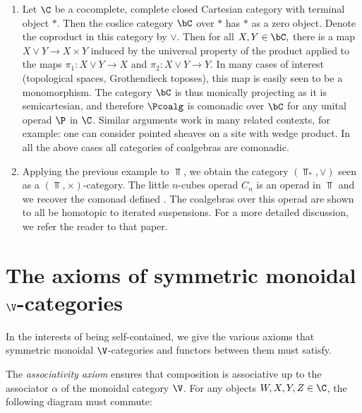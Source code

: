 \documentclass{tac}
\def\id{\operatorname{id}}
\def\bTop{{\Top_\ast}}
\begin{document}
\begin{enumerate}
     It follows that categories of $\P$-coalgebras in the above categories are comonadic.
    \item
    Let $\C$ be a cocomplete, complete closed Cartesian category with terminal object $\ast$. Then the coslice category $\bC$ over $\ast$ has $\ast$ as a zero object. Denote the coproduct in this category by $\vee.$ Then for all $X, Y \in \bC,$ there is a map $X \vee Y \to X\times Y$ induced by the universal property of the product applied to the maps $\pi_1: X\vee Y \to X$ and $\pi_2: X\vee Y \to Y.$ In many cases of interest (topological spaces, Grothendieck toposes), this map is easily seen to be a monomorphism. The category $\bC$ is thus monically projecting as it is semicartesian, and therefore $\Pcoalg$ is comonadic over $\bC$ for any unital operad $\P$ in $\C$.  Similar arguments work in many related contexts, for example: one can consider pointed sheaves on a site with wedge product. In all the above cases all categories of coalgebras are comonadic.
    \item 
    Applying the previous example to $\Top$, we obtain the category $(\bTop, \vee)$ seen as  a $(\Top, \times)$-category. The little $n$-cubes operad $C_n$ is an operad in $\Top$ and we recover the comonad defined \cite[Section 2]{me1}.  The coalgebras over this operad are shown to all be homotopic to iterated suspensions. For a more detailed discussion, we refer the reader to that paper. 
\end{enumerate}

\appendix
\section{The axioms of symmetric monoidal $\V$-categories}
\label{appenda}
In the interests of being self-contained, we give the various axioms that symmetric monoidal $\V$-categories and functors between them must satisfy.

The \emph{associativity axiom} ensures that composition is associative up to the associator $\alpha$ of the monoidal category $\V$. For any objects $W, X, Y, Z \in \C$, the following diagram must commute:
\begin{center}
\end{center}
\end{document}
